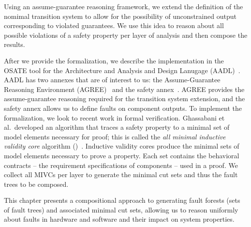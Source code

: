 Using an assume-guarantee reasoning framework, we extend the definition of the nomimal transition system to allow for the possibility of unconstrained output corresponding to violated guarantees. We use this idea to reason about all possible violations of a safety property per layer of analysis and then compose the results.

After we provide the formalization, we describe the implementation in the OSATE tool for the Architecture and Analysis and Design Lanugage (AADL)~\cite{FeilerModelBasedEngineering2012}. AADL has two annexes that are of interest to us: the Assume-Guarantee Reasoning Environment (AGREE)~\cite{NFM2012:CoGaMiWhLaLu} and the safety annex~\cite{stewart2020safety}. AGREE provides the assume-guarantee reasoning required for the transition system extension, and the safety annex allows us to define faults on component outputs. To implement the formalization, we look to recent work in formal verification. Ghassabani et al.~developed an algorithm that traces a safety property to a minimal set of model elements necessary for proof; this is called the \textit{all minimal inductive validity core} algorithm (\aivcalg)~\cite{GhassabaniGW16,Ghassabani2017EfficientGO}. Inductive validity cores produce the minimal sets of model elements necessary to prove a property. Each set contains the behavioral contracts -- the requirement specifications of components -- used in a proof. We collect all MIVCs per layer to generate the minimal cut sets and thus the fault trees to be composed.


This chapter presents a compositional approach to generating fault forests (sets of fault trees) and associated minimal cut sets, allowing us to reason uniformly about faults in hardware and software and their impact on system properties. 






